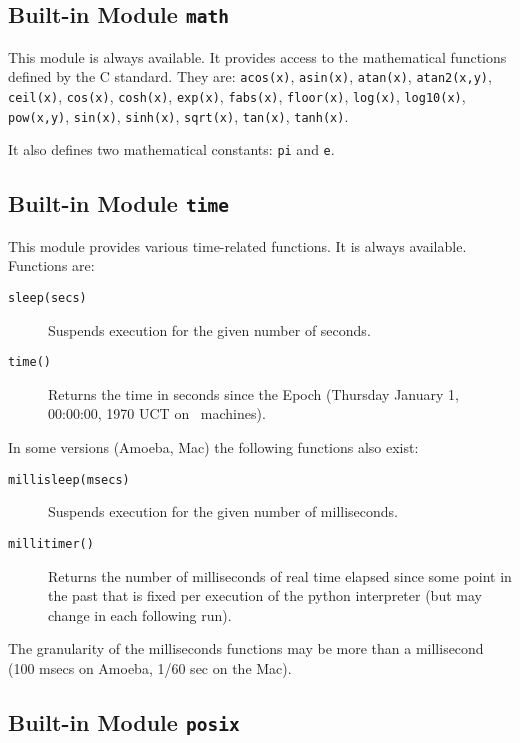 \subsection{Built-in Module {\tt math}}

This module is always available.
It provides access to the mathematical functions defined by the C
standard.
They are:
{\tt acos(x)},
{\tt asin(x)},
{\tt atan(x)},
{\tt atan2(x,y)},
{\tt ceil(x)},
{\tt cos(x)},
{\tt cosh(x)},
{\tt exp(x)},
{\tt fabs(x)},
{\tt floor(x)},
{\tt log(x)},
{\tt log10(x)},
{\tt pow(x,y)},
{\tt sin(x)},
{\tt sinh(x)},
{\tt sqrt(x)},
{\tt tan(x)},
{\tt tanh(x)}.

It also defines two mathematical constants:
{\tt pi}
and
{\tt e}.

\subsection{Built-in Module {\tt time}}

This module provides various time-related functions.
It is always available.
Functions are:
\begin{description}
\item[{\tt sleep(secs)}]
Suspends execution for the given number of seconds.
\item[{\tt time()}]
Returns the time in seconds since the Epoch (Thursday January 1,
00:00:00, 1970 UCT on \UNIX\ machines).
\end{description}

\noindent
In some versions (Amoeba, Mac) the following functions also exist:
\begin{description}
\item[{\tt millisleep(msecs)}]
Suspends execution for the given number of milliseconds.
\item[{\tt millitimer()}]
Returns the number of milliseconds of real time elapsed since some point
in the past that is fixed per execution of the python interpreter (but
may change in each following run).
\end{description}

\noindent
The granularity of the milliseconds functions may be more than a
millisecond (100 msecs on Amoeba, 1/60 sec on the Mac).

\subsection{Built-in Module {\tt posix}}

